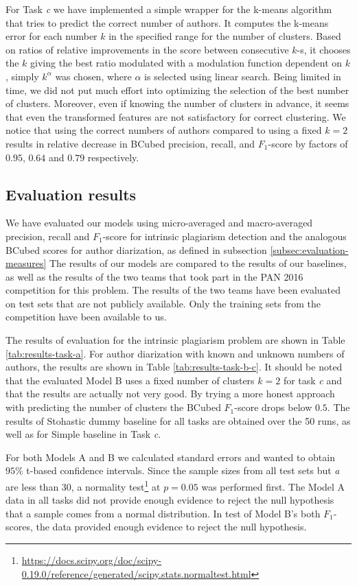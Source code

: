 \documentclass[10pt, a4paper]{article}
\begin{document}
For Task \emph{c} we have implemented a simple wrapper for the k-means algorithm that tries to predict the correct number of authors. It computes the k-means error for each number $k$ in the specified range for the number of clusters. Based on ratios of relative improvements in the score between consecutive $k$-s, it chooses the $k$ giving the best ratio modulated with a modulation function dependent on $k$, simply $k^\alpha$ was chosen, where $\alpha$ is selected using linear search. Being limited in time, we did not put much effort into optimizing the selection of the best number of clusters. Moreover, even if knowing the number of clusters in advance, it seems that even the transformed features are not satisfactory for correct clustering. We notice that using the correct numbers of authors compared to using a fixed $k=2$ results in relative decrease in BCubed precision, recall, and $F_1$-score by factors of $0.95$, $0.64$ and $0.79$ respectively.

\subsection{Evaluation results}

We have evaluated our models using micro-averaged and macro-averaged precision, recall and $F_1$-score for intrinsic plagiarism detection and the analogous BCubed scores for author diarization, as defined in subsection \ref{subsec:evaluation-measures} The results of our models are compared to the results of our baselines, as well as the results of the two teams that took part in the PAN 2016 competition for this problem. The results of the two teams have been evaluated on test sets that are not publicly available. Only the training sets from the competition have been available to us.

The results of evaluation for the intrinsic plagiarism problem are shown in Table \ref{tab:results-task-a}. For author diarization with known and unknown numbers of authors, the results are shown in Table \ref{tab:results-task-b-c}. It should be noted that the evaluated Model B uses a fixed number of clusters $k=2$ for task \emph{c} and that the results are actually not very good. By trying a more honest approach with predicting the number of clusters the BCubed $F_1$-score drops below $0.5$. The results of Stohastic dummy baseline for all tasks are obtained over the 50 runs, as well as for Simple baseline in Task \emph{c}.

For both Models A and B we calculated standard errors and wanted to obtain $95\%$ t-based confidence intervals. Since the sample sizes from all test sets but \emph{a} are less than $30$, a normality test\footnote{\url{https://docs.scipy.org/doc/scipy-0.19.0/reference/generated/scipy.stats.normaltest.html}} at $p=0.05$ was performed first. The Model A data in all tasks did not provide enough evidence to reject the null hypothesis that a sample comes from a normal distribution. In test of Model B's both $F_1$-scores, the data provided enough evidence to reject the null hypothesis.
\end{document}
